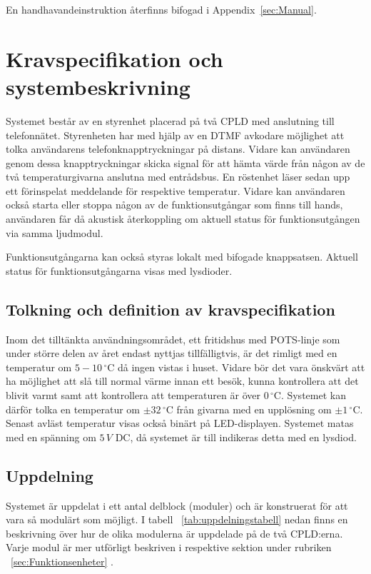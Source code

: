 \documentclass[a4paper,11pt]{article}
\begin{document}
	En handhavandeinstruktion återfinns bifogad i Appendix~\ref{sec:Manual}.

\pagebreak

\section{Kravspecifikation och systembeskrivning}
	Systemet består av en styrenhet placerad på två CPLD med anslutning till telefonnätet. Styrenheten har med hjälp av en DTMF avkodare möjlighet att tolka användarens telefonknapptryckningar på distans. Vidare kan användaren genom dessa knapptryckningar skicka signal för att hämta värde från någon av de två temperaturgivarna anslutna med entrådsbus. En röstenhet läser sedan upp ett förinspelat meddelande för respektive temperatur. Vidare kan användaren också starta eller stoppa någon av de funktionsutgångar som finns till hands, användaren får då akustisk återkoppling om aktuell status för funktionsutgången via samma ljudmodul.

Funktionsutgångarna kan också styras lokalt med bifogade knappsatsen. Aktuell status för funktionsutgångarna visas med lysdioder. 

	\subsection{Tolkning och definition av kravspecifikation}

		Inom det tilltänkta användningsområdet, ett fritidshus med POTS-linje som under större delen av året endast nyttjas tillfälligtvis, är det rimligt med en temperatur om $5-10\,^{\circ}\mathrm{C}$ då ingen vistas i huset. Vidare bör det vara önskvärt att ha möjlighet att slå till normal värme innan ett besök, kunna kontrollera att det blivit varmt samt att kontrollera att temperaturen är över $0\,^{\circ}\mathrm{C}$. Systemet kan därför tolka en temperatur om $\pm 32\,^{\circ}\mathrm{C}$ från givarna med en upplösning om $\pm 1\,^{\circ}\mathrm{C}$. Senast avläst temperatur visas också binärt på LED-displayen. Systemet matas med en spänning om $5\,V$ DC, då systemet är till indikeras detta med en lysdiod.

	\subsection{Uppdelning}

	Systemet är uppdelat i ett antal delblock (moduler) och är konstruerat för att vara så modulärt som möjligt.
	I tabell ~\ref{tab:uppdelningstabell} nedan finns en beskrivning över hur de olika modulerna är uppdelade på de två CPLD:erna. Varje modul är mer
	utförligt beskriven i respektive sektion under rubriken ~\ref{sec:Funktionsenheter} . 
\end{document}
